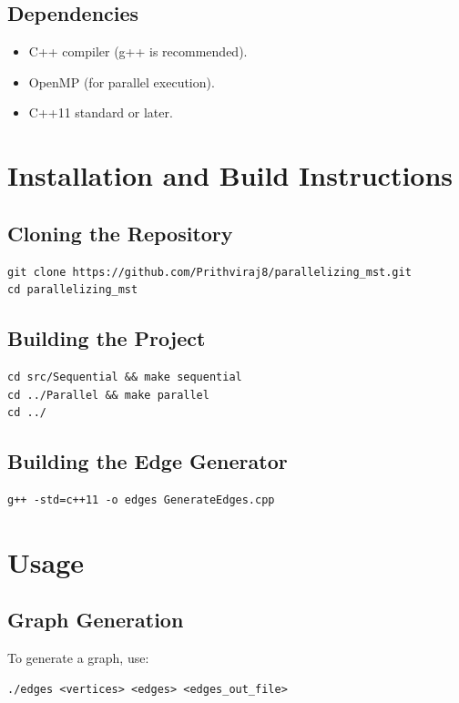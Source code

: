 \documentclass[11pt]{article}
\begin{document}
\subsection{Dependencies}
\begin{itemize}
    \item C++ compiler (g++ is recommended).
    \item OpenMP (for parallel execution).
    \item C++11 standard or later.
\end{itemize}

\section{Installation and Build Instructions}
\subsection{Cloning the Repository}
\begin{lstlisting}
git clone https://github.com/Prithviraj8/parallelizing_mst.git
cd parallelizing_mst
\end{lstlisting}

\subsection{Building the Project}
\begin{lstlisting}
cd src/Sequential && make sequential
cd ../Parallel && make parallel
cd ../
\end{lstlisting}

\subsection{Building the Edge Generator}
\begin{lstlisting}
g++ -std=c++11 -o edges GenerateEdges.cpp
\end{lstlisting}

\section{Usage}
\subsection{Graph Generation}
To generate a graph, use:
\begin{lstlisting}
./edges <vertices> <edges> <edges_out_file>
\end{lstlisting}
\end{document}
